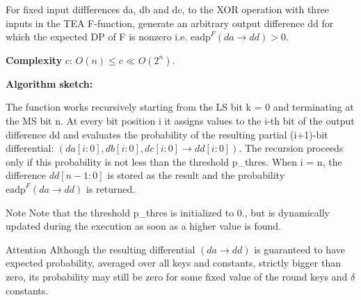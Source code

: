 \-For fixed input diffferences {\ttfamily da}, {\ttfamily db} and {\ttfamily dc}, to the \-X\-O\-R operation with three inputs in the \-T\-E\-A \-F-\/function, generate an arbitrary output difference {\ttfamily dd} for which the expected \-D\-P of \-F is nonzero i.\-e. $\mathrm{eadp}^{F}(da \rightarrow dd) > 0$.

{\bfseries \-Complexity} c\-: $O(n) \le c \ll O(2^n)$.

{\bfseries \-Algorithm} {\bfseries sketch\-:} 

\-The function works recursively starting from the \-L\-S bit {\ttfamily k} = 0 and terminating at the \-M\-S bit {\ttfamily n}. \-At every bit position i it assigns values to the i-\/th bit of the output difference {\ttfamily dd} and evaluates the probability of the resulting partial (i+1)-\/bit differential\-: $(da[i:0], db[i:0], dc[i:0] \rightarrow dd[i:0])$. \-The recursion proceeds only if this probability is not less than the threshold {\ttfamily p\-\_\-thres}. \-When i = n, the difference $dd[n-1:0]$ is stored as the result and the probability $\mathrm{eadp}^{F}(da \rightarrow dd)$ is returned.

\begin{DoxyNote}{\-Note}
\-Note that the threshold {\ttfamily p\-\_\-thres} is initialized to 0., but is dynamically updated during the execution as soon as a higher value is found.
\end{DoxyNote}
\begin{DoxyAttention}{\-Attention}
\-Although the resulting differential $(da \rightarrow dd)$ is guaranteed to have expected probability, averaged over all keys and constants, strictly bigger than zero, its probability may still be zero for some fixed value of the round keys and $\delta$ constants.
\end{DoxyAttention}

